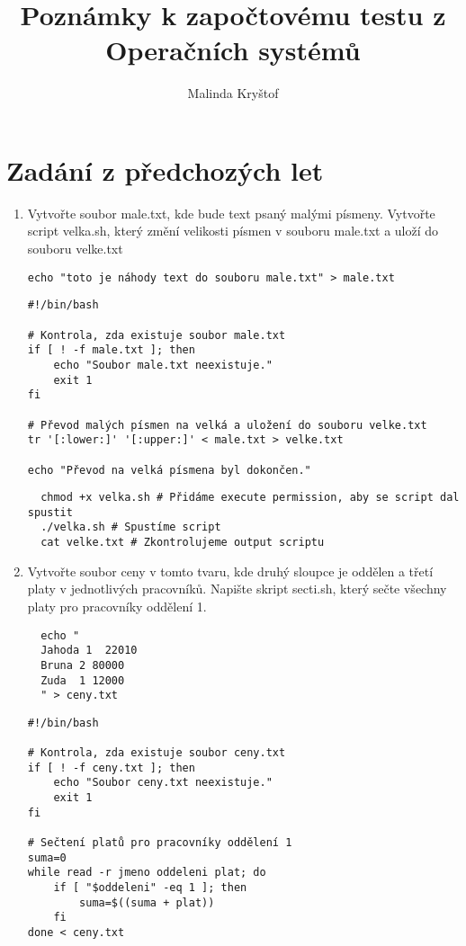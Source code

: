 \documentclass{article}
\title{Poznámky k započtovému testu z Operačních systémů}
\author{Malinda Kryštof}
\begin{document}
\maketitle


\section{Zadání z předchozých let}
\begin{enumerate}
  \item Vytvořte soubor male.txt, kde bude text psaný malými písmeny. Vytvořte script velka.sh, který změní velikosti písmen v souboru male.txt a uloží do souboru velke.txt
\begin{lstlisting}[caption=Vytvoříme soubor male.txt]
  echo "toto je náhody text do souboru male.txt" > male.txt
\end{lstlisting}
\begin{lstlisting}[caption=Jak by měl vypadat velka.sh]
#!/bin/bash

# Kontrola, zda existuje soubor male.txt
if [ ! -f male.txt ]; then
    echo "Soubor male.txt neexistuje."
    exit 1
fi

# Převod malých písmen na velká a uložení do souboru velke.txt
tr '[:lower:]' '[:upper:]' < male.txt > velke.txt

echo "Převod na velká písmena byl dokončen."
\end{lstlisting}
\begin{lstlisting}
  chmod +x velka.sh # Přidáme execute permission, aby se script dal spustit
  ./velka.sh # Spustíme script
  cat velke.txt # Zkontrolujeme output scriptu
\end{lstlisting}
  \item Vytvořte soubor ceny v tomto tvaru, kde druhý sloupce je oddělen a třetí platy v jednotlivých pracovníků. Napište skript secti.sh, který sečte všechny platy pro pracovníky oddělení 1.
\begin{lstlisting}
  echo "
  Jahoda 1  22010
  Bruna 2 80000
  Zuda  1 12000
  " > ceny.txt
\end{lstlisting}
\begin{lstlisting}[caption=skript secti.sh]
#!/bin/bash

# Kontrola, zda existuje soubor ceny.txt
if [ ! -f ceny.txt ]; then
    echo "Soubor ceny.txt neexistuje."
    exit 1
fi

# Sečtení platů pro pracovníky oddělení 1
suma=0
while read -r jmeno oddeleni plat; do
    if [ "$oddeleni" -eq 1 ]; then
        suma=$((suma + plat))
    fi
done < ceny.txt


\end{lstlisting}
\end{enumerate}
\end{document}
